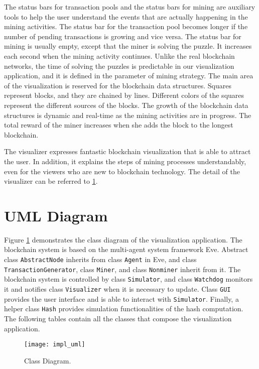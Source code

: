 The status bars for transaction pools and the status bars for mining are auxiliary tools to help the user understand the events that are actually happening in the mining activities. The status bar for the transaction pool becomes longer if the number of pending transactions is growing and vice versa. The status bar for mining is usually empty, except that the miner is solving the puzzle. It increases each second when the mining activity continues. Unlike the real blockchain networks, the time of solving the puzzles is predictable in our visualization application, and it is defined in the parameter of mining strategy. The main area of the visualization is reserved for the blockchain data structures. Squares represent blocks, and they are chained by lines. Different colors of the squares represent the different sources of the blocks. The growth of the blockchain data structures is dynamic and real-time as the mining activities are in progress. The total reward of the miner increases when she adds the block to the longest blockchain. 

The visualizer expresses fantastic blockchain visualization that is able to attract the user. In addition, it explains the steps of mining processes understandably, even for the viewers who are new to blockchain technology. The detail of the visualizer can be referred to \ref{sec:uml diagram}.

\section{UML Diagram}
\label{sec:uml diagram}

Figure \ref{fig:class diagram} demonstrates the class diagram of the visualization application. The blockchain system is based on the multi-agent system framework Eve. Abstract class \texttt{AbstractNode} inherits from class \texttt{Agent} in Eve, and class \texttt{TransactionGenerator}, class \texttt{Miner}, and class \texttt{Nonminer} inherit from it. The blockchain system is controlled by class \texttt{Simulator}, and class \texttt{Watchdog} monitors it and notifies class \texttt{Visualizer} when it is necessary to update. Class \texttt{GUI} provides the user interface and is able to interact with \texttt{Simulator}. Finally, a helper class \texttt{Hash} provides simulation functionalities of the hash computation. The following tables contain all the classes that compose the visualization application.

\clearpage

\vspace*{\fill}
\begin{figure}[!ht]
    \centering
    \texttt{[image: impl\_uml]}
    \caption{Class Diagram.}
    \label{fig:class diagram}
\end{figure}
\vspace*{\fill}

